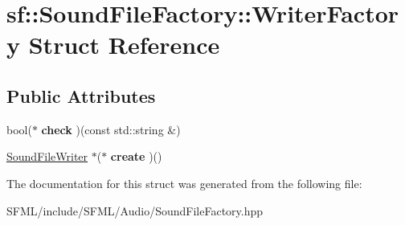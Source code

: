 \hypertarget{structsf_1_1_sound_file_factory_1_1_writer_factory}{}\section{sf\+:\+:Sound\+File\+Factory\+:\+:Writer\+Factory Struct Reference}
\label{structsf_1_1_sound_file_factory_1_1_writer_factory}
\subsection*{Public Attributes}
\begin{DoxyCompactItemize}
\item 
\mbox{\label{structsf_1_1_sound_file_factory_1_1_writer_factory_a72754501f3081c9a68a9b6f0c648f89c}} 
bool($\ast$ {\bfseries check} )(const std\+::string \&)
\item 
\mbox{\label{structsf_1_1_sound_file_factory_1_1_writer_factory_a3e35cf39adef5b5bb2e96b45108f1166}} 
\mbox{\hyperlink{classsf_1_1_sound_file_writer}{Sound\+File\+Writer}} $\ast$($\ast$ {\bfseries create} )()
\end{DoxyCompactItemize}


The documentation for this struct was generated from the following file\+:\begin{DoxyCompactItemize}
\item 
S\+F\+M\+L/include/\+S\+F\+M\+L/\+Audio/Sound\+File\+Factory.\+hpp\end{DoxyCompactItemize}
